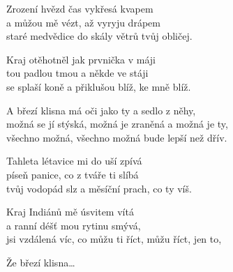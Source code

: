 
\ve{}
Zrození hvězd čas vykřesá kvapem\\
a můžou mě vézt, až vyryju drápem\\
staré medvědice do skály větrů tvůj obličej.

\ve{}
Kraj otěhotněl jak prvnička v máji\\
tou padlou tmou a někde ve stáji\\
se splaší koně a přiklušou blíž, ke mně blíž.

\cho{}
A březí klisna má oči jako ty a sedlo z něhy,\\
možná se jí stýská, možná je zraněná a možná je ty,\\
všechno možná, všechno možná bude lepší než dřív.

\ve{}
Tahleta létavice mi do uší zpívá\\
píseň panice, co z tváře ti slíbá\\
tvůj vodopád slz a měsíční prach, co ty víš.

\ve{}
Kraj Indiánů mě úsvitem vítá\\
a ranní déšť mou rytinu smývá,\\
jsi vzdálená víc, co můžu ti říct, můžu říct, jen to,

\cho{}
Že březí klisna\ldots{}

\cho{}

\esong